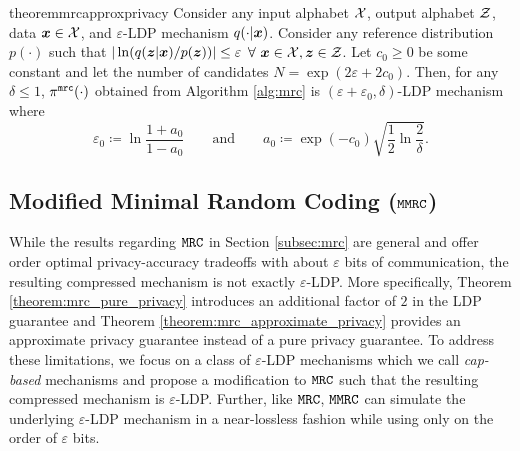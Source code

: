 \begin{restatable}{theorem}{mrcapproxprivacy}\label{theorem:mrc_approximate_privacy}
Consider any input alphabet $\mathcal{X}$, output alphabet $\mathcal{Z}$, data ${\boldsymbol{x}} \in \mathcal{X}$, and $\varepsilon$-LDP mechanism $q(\cdot|{\boldsymbol{x}})$. Consider any reference distribution $p(\cdot)$ such that $ | \ln (q({\boldsymbol{z}}|{\boldsymbol{x}}) / p({\boldsymbol{z}})) | \leq \varepsilon$  $\forall ~ {\boldsymbol{x}} \in \mathcal{X}, {\boldsymbol{z}} \in \mathcal{Z}$.\textBlue{\footnotemark[5]}  Let $c_0 \geq 0$ be some constant and let the number of candidates $N = \exp(2\varepsilon + 2c_0)$. Then, for any $\delta \leq 1$, $\pi^{\texttt{mrc}}(\cdot)$ obtained from Algorithm \ref{alg:mrc} is $(\varepsilon + \varepsilon_0, \delta)$-LDP mechanism where
\begin{equation}
 \textstyle
    \varepsilon_0 \coloneqq \ln\dfrac{1+a_0}{1-a_0} \qquad \text{and} \qquad a_0 \coloneqq \exp(-c_0)\sqrt{\frac{1}{2}\ln\frac{2}{\delta}}.
\end{equation}
\end{restatable}




\subsection{Modified Minimal Random Coding (\texorpdfstring{$\texttt{MMRC}$}{MMRC})}
\label{subsec:mmrc}
While the results regarding $\texttt{MRC}$ in Section \ref{subsec:mrc} are general and offer order optimal privacy-accuracy tradeoffs with about $\varepsilon$ bits of communication, the resulting compressed mechanism is not exactly $\varepsilon$-LDP. More specifically, Theorem \ref{theorem:mrc_pure_privacy} introduces an additional factor of $2$ in the LDP guarantee and Theorem \ref{theorem:mrc_approximate_privacy} provides an approximate privacy guarantee instead of a pure privacy guarantee. To address these limitations, we focus on a class of $\varepsilon$-LDP mechanisms which we call \emph{cap-based} mechanisms and propose a modification to $\texttt{MRC}$ such that the resulting compressed mechanism is $\varepsilon$-LDP. Further, like $\texttt{MRC}$, $\texttt{MMRC}$ can simulate the underlying $\varepsilon$-LDP mechanism in a near-lossless fashion while using only on the order of $\varepsilon$ bits.

